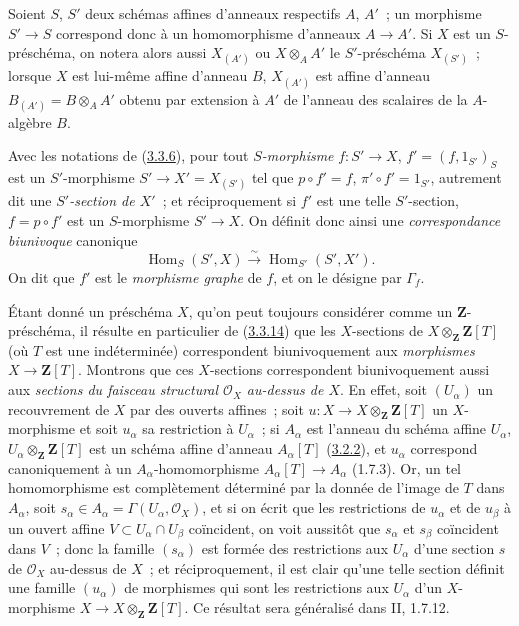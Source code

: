 \begin{env}[3.3.13]
\label{I.3.3.13-fr}
Soient $S$, $S'$ deux schémas affines d'anneaux respectifs $A$, $A'$~; un
morphisme $S'\to S$ correspond donc à un homomorphisme d'anneaux $A\to A'$.
Si $X$ est un $S$-préschéma, on notera alors aussi $X_{(A')}$ ou
$X\otimes_A A'$ le $S'$-préschéma $X_{(S')}$~; lorsque $X$ est lui-même
affine d'anneau $B$, $X_{(A')}$ est affine d'anneau
$B_{(A')}=B\otimes_A A'$ obtenu par extension à $A'$ de l'anneau des scalaires
de la $A$-algèbre $B$.
\end{env}

\begin{env}[3.3.14]
\label{I.3.3.14-fr}
Avec les notations de (\hyperref[I.3.3.6-fr]{3.3.6}), pour tout
\emph{$S$-morphisme} $f:S'\to X$, $f'=(f,1_{S'})_S$ est un $S'$-morphisme
$S'\to X'=X_{(S')}$ tel que $p\circ f'=f$, $\pi'\circ f'=1_{S'}$, autrement
dit une \emph{$S'$-section de $X'$}~; et réciproquement si $f'$ est une telle
$S'$-section, $f=p\circ f'$ est un $S$-morphisme $S'\to X$. On définit donc
ainsi une \emph{correspondance biunivoque} canonique
\label{I.3.3.14.correspondence-fr}
\[
  \operatorname{Hom}_S(S',X)\overset{\sim}{\longrightarrow}
  \operatorname{Hom}_{S'}(S',X').
\]
On dit que $f'$ est le \emph{morphisme graphe} de $f$, et on le désigne par
$\Gamma_f$.
\end{env}

\begin{env}[3.3.15]
\label{I.3.3.15-fr}
Étant donné un préschéma $X$, qu'on peut toujours considérer comme un
$\mathbf{Z}$-préschéma, il résulte en particulier de
(\hyperref[I.3.3.14-fr]{3.3.14}) que les $X$-sections de
$X\otimes_{\mathbf{Z}}\mathbf{Z}[T]$ (où $T$ est une indéterminée)
correspondent biunivoquement aux \emph{morphismes}
$X\to\mathbf{Z}[T]$. Montrons que ces $X$-sections correspondent
biunivoquement aussi aux \emph{sections du faisceau structural
$\mathcal{O}_X$ au-dessus de $X$}. En effet, soit $(U_\alpha)$ un recouvrement
de $X$ par des ouverts affines~; soit
$u:X\to X\otimes_{\mathbf{Z}}\mathbf{Z}[T]$ un $X$-morphisme et soit
$u_\alpha$ sa restriction à $U_\alpha$~; si $A_\alpha$ est l'anneau du schéma
affine $U_\alpha$, $U_\alpha\otimes_{\mathbf{Z}}\mathbf{Z}[T]$ est un schéma
affine d'anneau $A_\alpha[T]$ (\hyperref[I.3.2.2-fr]{3.2.2}), et $u_\alpha$
correspond canoniquement à un $A_\alpha$-homomorphisme
$A_\alpha[T]\to A_\alpha$ (1.7.3). Or, un tel homomorphisme est complètement
déterminé par la donnée de l'image de $T$ dans $A_\alpha$, soit
$s_\alpha\in A_\alpha=\Gamma(U_\alpha,\mathcal{O}_X)$, et si on écrit que les
restrictions de $u_\alpha$ et de $u_\beta$ à un ouvert affine
$V\subset U_\alpha\cap U_\beta$ coïncident, on voit aussitôt que $s_\alpha$
et $s_\beta$ coïncident dans $V$~; donc la famille $(s_\alpha)$ est formée des
restrictions aux $U_\alpha$ d'une section $s$ de $\mathcal{O}_X$ au-dessus de
$X$~; et réciproquement, il est clair qu'une telle section définit une famille
$(u_\alpha)$ de morphismes qui sont les restrictions aux $U_\alpha$ d'un
$X$-morphisme $X\to X\otimes_{\mathbf{Z}}\mathbf{Z}[T]$. Ce résultat sera
généralisé dans II, 1.7.12.
\end{env}

